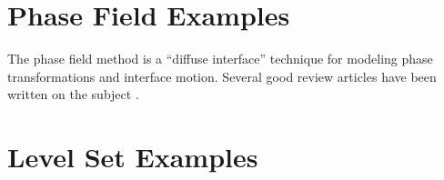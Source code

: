 \documentclass[letterpaper,twoside,openright,10pt]{memoir}
\begin{document}



\label{sec:Examples:convection:robin}


\label{sec:Examples:convection:source}
% 
% 

\chapter{Phase Field Examples}

The phase field method is a ``diffuse interface'' technique for
modeling phase transformations and interface motion. Several good
review articles have been written on the subject
\cite{BoettingerReview:2002,ChenReview:2002,McFaddenReview:2002}.






\label{sec:anisotropy}


\label{sec:impingement}


% 

% 
% 
% 
% 

% 
% 


\chapter{Level Set Examples}
\end{document}
